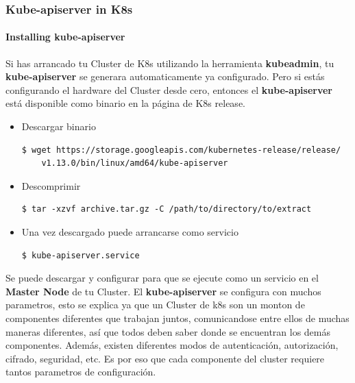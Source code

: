 \documentclass{article}
\newenvironment{codetemplate}[1][]{%
  \mybasecolorbox[#1]
  \itshape
}{%
  \endmybasecolorbox
}
\begin{document}
\subsubsection{Kube-apiserver in K8s}

\paragraph{Installing kube-apiserver}

Si has arrancado tu Cluster de K8s utilizando la herramienta \textbf{kubeadmin}, tu \textbf{kube-apiserver} se generara automaticamente ya configurado. Pero si estás configurando el hardware del Cluster desde cero, entonces el \textbf{kube-apiserver} está disponible como binario en la página de K8s release.

\begin{itemize}
    \item Descargar binario
\begin{codetemplate}{}
\begin{verbatim}
$ wget https://storage.googleapis.com/kubernetes-release/release/
    v1.13.0/bin/linux/amd64/kube-apiserver
\end{verbatim}
\end{codetemplate}

    \item Descomprimir
\begin{codetemplate}{}
\begin{verbatim}
$ tar -xzvf archive.tar.gz -C /path/to/directory/to/extract
\end{verbatim}
\end{codetemplate} 

    \item Una vez descargado puede arrancarse como servicio
\begin{codetemplate}{}
\begin{verbatim}
$ kube-apiserver.service
\end{verbatim}
\end{codetemplate}
\end{itemize}

Se puede descargar y configurar para que se ejecute como un servicio en el \textbf{Master Node} de tu Cluster. El \textbf{kube-apiserver} se configura con muchos parametros, esto se explica ya que un Cluster de k8s son un monton de componentes diferentes que trabajan juntos, comunicandose entre ellos de muchas maneras diferentes, así que todos deben saber donde se encuentran los demás componentes. Además, existen diferentes modos de autenticación, autorización, cifrado, seguridad, etc. Es por eso que cada componente del cluster requiere tantos parametros de configuración.
\end{document}
